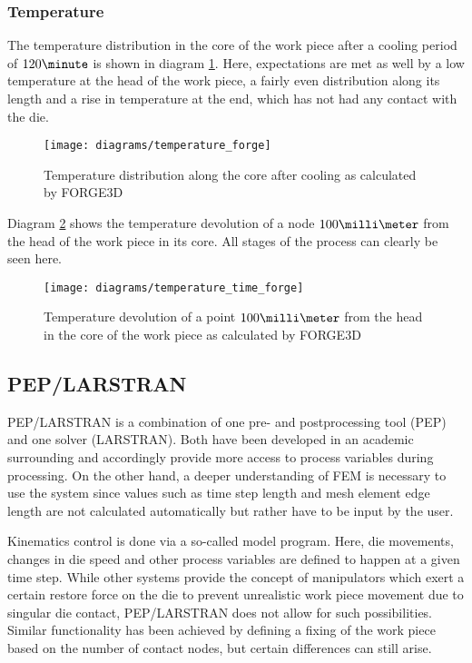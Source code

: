 \subsubsection{Temperature}

The temperature distribution in the core of the work piece after a cooling period of $120\minute$ is shown in diagram \ref{img:temp_forge}. Here, expectations are met as well by a low temperature at the head of the work piece, a fairly even distribution along its length and a rise in temperature at the end, which has not had any contact with the die.

\begin{figure}[htbp]
  \centering
  \texttt{[image: diagrams/temperature\_forge]}
  \caption{Temperature distribution along the core after cooling as calculated by FORGE3D}
  \label{img:temp_forge}
\end{figure}

Diagram \ref{img:temp_time_forge} shows the temperature devolution of a node $100\milli\meter$ from the head of the work piece in its core. All stages of the process can clearly be seen here.

\begin{figure}[htbp]
  \centering
  \texttt{[image: diagrams/temperature\_time\_forge]}
  \caption{Temperature devolution of a point $100\milli\meter$ from the head in the core of the work piece as calculated by FORGE3D}
  \label{img:temp_time_forge}
\end{figure}


\subsection{PEP/LARSTRAN}

PEP/LARSTRAN is a combination of one pre- and postprocessing tool (PEP) and one solver (LARSTRAN). Both have been developed in an academic surrounding and accordingly provide more access to process variables during processing. On the other hand, a deeper understanding of FEM is necessary to use the system since values such as time step length and mesh element edge length are not calculated automatically but rather have to be input by the user.

Kinematics control is done via a so-called model program. Here, die movements, changes in die speed and other process variables are defined to happen at a given time step. While other systems provide the concept of manipulators which exert a certain restore force on the die to prevent unrealistic work piece movement due to singular die contact, PEP/LARSTRAN does not allow for such possibilities. Similar functionality has been achieved by defining a fixing of the work piece based on the number of contact nodes, but certain differences can still arise.

